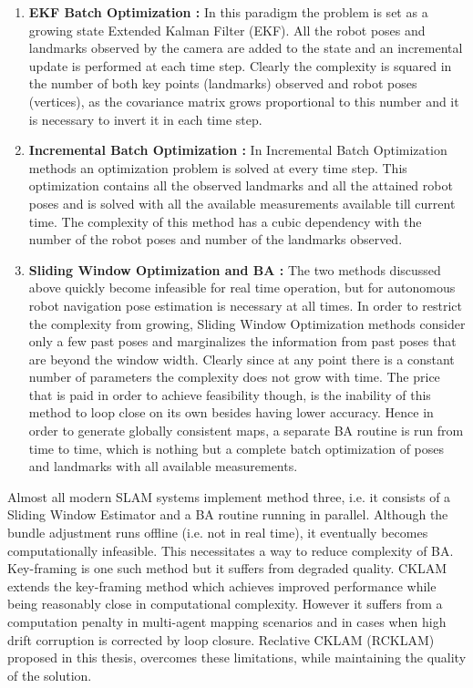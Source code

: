 \begin{enumerate}
  \item \textbf{EKF Batch Optimization :} 
  In this paradigm the problem is set as a growing state Extended Kalman Filter (EKF). All the robot poses and landmarks observed by the camera are added to the state and an incremental update is performed at each time step. Clearly the complexity is squared in the number of both key points (landmarks) observed and robot poses (vertices), as the covariance matrix grows proportional to this number and it is necessary to invert it in each time step. 
  \item \textbf{Incremental Batch Optimization :} 
  In Incremental Batch Optimization methods an optimization problem is solved at every time step. This optimization contains all the observed landmarks and all the attained robot poses and is solved with all the available measurements available till current time. The complexity of this method has a cubic dependency with the number of the robot poses and number of the landmarks observed.
  \item \textbf{Sliding Window Optimization and BA :} 
  The two methods discussed above quickly become infeasible for real time operation, but for autonomous robot navigation pose estimation is necessary at all times. In order to restrict the complexity from growing, Sliding Window Optimization methods consider only a few past poses and marginalizes the information from past poses that are beyond the window width. Clearly since at any point there is a constant number of parameters the complexity does not grow with time. The price that is paid in order to achieve feasibility though, is the inability of this method to loop close on its own besides having lower accuracy. Hence in order to generate globally consistent maps, a separate BA routine is run from time to time, which is nothing but a complete batch optimization of poses and landmarks with all available measurements.
\end{enumerate}

Almost all modern SLAM systems implement method three, i.e. it consists of a Sliding Window Estimator and a BA routine running in parallel. Although the bundle adjustment runs offline (i.e. not in real time), it eventually becomes computationally infeasible. This necessitates a way to reduce complexity of BA. Key-framing is one such method but it suffers from degraded quality. CKLAM extends the key-framing method which achieves improved performance while being reasonably close in computational complexity. However it suffers from a computation penalty in multi-agent mapping scenarios and in cases when high drift corruption is corrected by loop closure. Reclative CKLAM (RCKLAM) proposed in this thesis, overcomes these limitations, while maintaining the quality of the solution.

